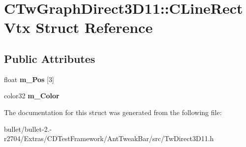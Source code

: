 \hypertarget{struct_c_tw_graph_direct3_d11_1_1_c_line_rect_vtx}{\section{C\+Tw\+Graph\+Direct3\+D11\+:\+:C\+Line\+Rect\+Vtx Struct Reference}
\label{struct_c_tw_graph_direct3_d11_1_1_c_line_rect_vtx}
}
\subsection*{Public Attributes}
\begin{DoxyCompactItemize}
\item 
\hypertarget{struct_c_tw_graph_direct3_d11_1_1_c_line_rect_vtx_a771d735b990335e5fccf5866da8effbe}{float {\bfseries m\+\_\+\+Pos} \mbox{[}3\mbox{]}}\label{struct_c_tw_graph_direct3_d11_1_1_c_line_rect_vtx_a771d735b990335e5fccf5866da8effbe}

\item 
\hypertarget{struct_c_tw_graph_direct3_d11_1_1_c_line_rect_vtx_aa6d9bd5b66f803c13c05188fc36045bc}{color32 {\bfseries m\+\_\+\+Color}}\label{struct_c_tw_graph_direct3_d11_1_1_c_line_rect_vtx_aa6d9bd5b66f803c13c05188fc36045bc}

\end{DoxyCompactItemize}


The documentation for this struct was generated from the following file\+:\begin{DoxyCompactItemize}
\item 
bullet/bullet-\/2.-\/r2704/\+Extras/\+C\+D\+Test\+Framework/\+Ant\+Tweak\+Bar/src/Tw\+Direct3\+D11.\+h\end{DoxyCompactItemize}
